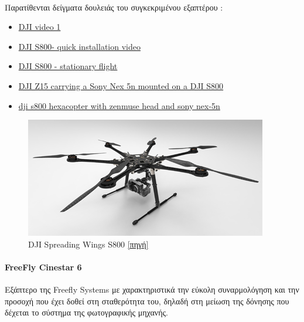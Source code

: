 \documentclass[a4paper, 12pt, twoside]{report}
\begin{document}
{{{{{{			\paragraph{}{Παρατίθενται δείγματα δουλειάς του συγκεκριμένου εξαπτέρου :
				\begin{itemize}
					\item \href{http://www.youtube.com/watch?v=PXCc_1IqXW4}{DJI video 1}
					\item \href{http://www.youtube.com/watch?v=GldKyaEqlUA}{DJI S800- quick installation video}
					\item \href{http://www.youtube.com/watch?v=zr1npAPBLEo}{DJI S800 - stationary flight}
					\item \href{https://vimeo.com/44573759}{DJI Z15 carrying a Sony Nex 5n mounted on a DJI S800}
					\item \href{https://vimeo.com/48097149}{dji s800 hexacopter with zenmuse head and sony nex-5n}
				\end{itemize}
			}
			\begin{figure}[hp]
					\centering
					\includegraphics[scale=0.50]{DJI_S800.png}
					\caption{DJI Spreading Wings S800 \href{http://www.dji-innovations.com/wp-content/uploads/2012/05/S800_1.jpg}{[πηγή]}}
					\label{φωτ:DJI Spreading Wings S800}
			\end{figure}
			
			
			\paragraph{FreeFly Cinestar 6}{Εξάπτερο της Freefly Systems με χαρακτηριστικά την εύκολη συναρμολόγηση και την προσοχή που έχει δοθεί στη σταθερότητα του, δηλαδή στη μείωση της δόνησης που δέχεται το σύστημα της φωτογραφικής μηχανής.
			}
}}}}}}
\end{document}
